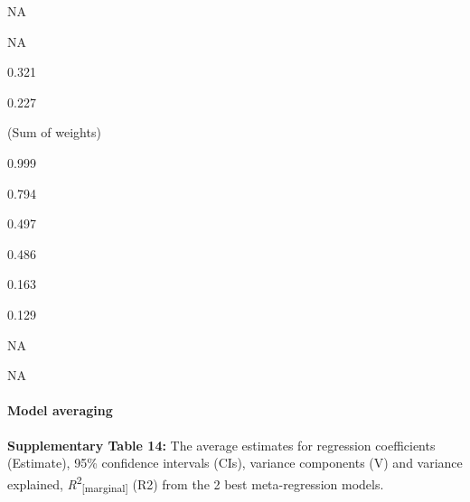 \documentclass[
]{article}
\begin{document}
NA

NA

0.321

0.227

(Sum of weights)

0.999

0.794

0.497

0.486

0.163

0.129

NA

NA

\hypertarget{model-averaging}{%
\paragraph{Model averaging}\label{model-averaging}}

\textbf{Supplementary Table 14:} The average estimates for regression
coefficients (Estimate), 95\% confidence intervals (CIs), variance
components (V) and variance explained,
\emph{R}\textsuperscript{2}\textsubscript{{[}marginal{]}} (R2) from the
2 best meta-regression models.
\end{document}
